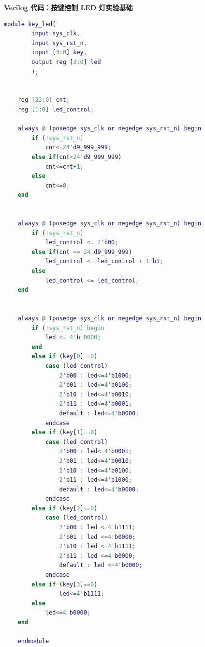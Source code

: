 \documentclass[UTF8]{article}
\theoremstyle{MyLineTheoremStyle} %
\theoremstyle{MyBlockTheoremStyle} %
\theoremstyle{MySubsubsectionStyle} %
\begin{document}
\textbf{Verilog 代码：按键控制 LED 灯实验基础}
\begin{lstlisting}[language=Matlab, style=MatlabStyle_src]
    module key_led(
        input sys_clk,
        input sys_rst_n,
        input [3:0] key,
        output reg [3:0] led
        );
        
        
    reg [23:0] cnt;
    reg [1:0] led_control;
    
    always @ (posedge sys_clk or negedge sys_rst_n) begin
        if (!sys_rst_n)
            cnt<=24'd9_999_999;
        else if(cnt<24'd9_999_999)
            cnt<=cnt+1;
        else
            cnt<=0;
    end
    
    
    always @ (posedge sys_clk or negedge sys_rst_n) begin
        if (!sys_rst_n)
            led_control <= 2'b00;
        else if(cnt == 24'd9_999_999)
            led_control <= led_control + 1'b1;
        else
            led_control <= led_control;
    end
    
    
    always @ (posedge sys_clk or negedge sys_rst_n) begin
        if (!sys_rst_n) begin
            led <= 4'b 0000;
        end
        else if (key[0]==0)
            case (led_control)
                2'b00 : led<=4'b1000;
                2'b01 : led<=4'b0100;
                2'b10 : led<=4'b0010;
                2'b11 : led<=4'b0001;
                default : led<=4'b0000;
            endcase
        else if (key[1]==0)
            case (led_control)
                2'b00 : led<=4'b0001;
                2'b01 : led<=4'b0010;
                2'b10 : led<=4'b0100;
                2'b11 : led<=4'b1000;
                default : led<=4'b0000;
            endcase
        else if (key[2]==0)
            case (led_control)
                2'b00 : led <=4'b1111;
                2'b01 : led <=4'b0000;
                2'b10 : led <=4'b1111;
                2'b11 : led <=4'b0000;
                default : led <=4'b0000;
            endcase
        else if (key[3]==0)
                led<=4'b1111;
        else
            led<=4'b0000;
    end 
    
    endmodule
                
\end{lstlisting}


\cleardoublepage
\end{document}

